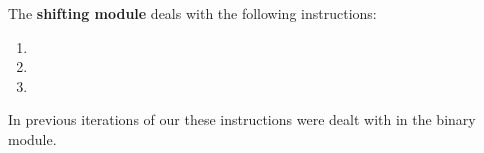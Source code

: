 The \textbf{shifting module} deals with the following instructions:
\begin{multicols}{3}
\begin{enumerate}
	\item {}
	\item {}
	\item {}
\end{enumerate}
\end{multicols}
\noindent In previous iterations of our \zkEvm{} these instructions were dealt with in the binary module.
